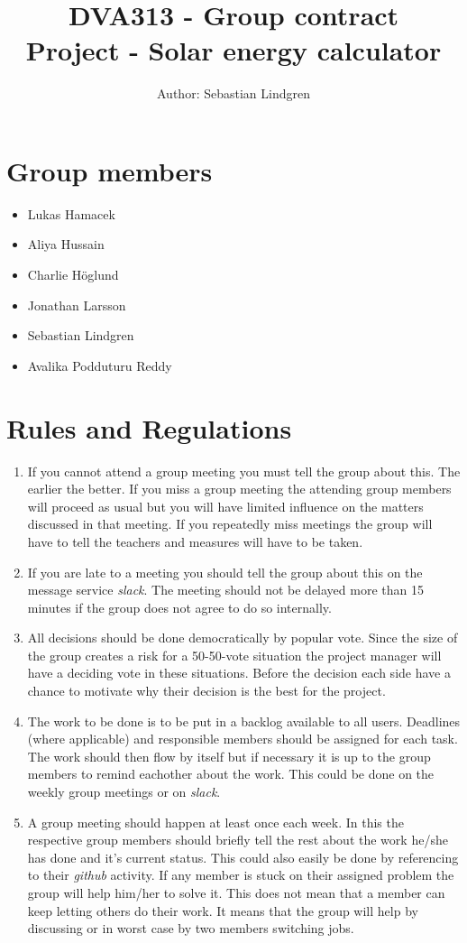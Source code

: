 \documentclass[]{article}
\title{DVA313 - Group contract\\Project - Solar energy calculator}
\author{Author: Sebastian Lindgren}
\begin{document}
\maketitle

\section{Group members}
\begin{itemize}
	\item Lukas Hamacek
	\item Aliya Hussain
	\item Charlie Höglund
	\item Jonathan Larsson
	\item Sebastian Lindgren
	\item Avalika Podduturu Reddy
\end{itemize}

\section{Rules and Regulations}
\begin{enumerate}
	\item If you cannot attend a group meeting you must tell the group about this. The earlier the better. If you miss a group meeting the attending group members will proceed as usual but you will have limited influence on the matters discussed in that meeting. If you repeatedly miss meetings the group will have to tell the teachers and measures will have to be taken. 
	\item If you are late to a meeting you should tell the group about this on the message service \textit{slack}. The meeting should not be delayed more than 15 minutes if the group does not agree to do so internally.
	\item All decisions should be done democratically by popular vote. Since the size of the group creates a risk for a 50-50-vote situation the project manager will have a deciding vote in these situations. Before the decision each side have a chance to motivate why their decision is the best for the project.
	\item The work to be done is to be put in a backlog available to all users. Deadlines (where applicable) and responsible members should be assigned for each task. The work should then flow by itself but if necessary it is up to the group members to remind eachother about the work. This could be done on the weekly group meetings or on \textit{slack}.
	\item A group meeting should happen at least once each week. In this the respective group members should briefly tell the rest about the work he/she has done and it's current status. This could also easily be done by referencing to their \textit{github} activity. If any member is stuck on their assigned problem the group will help him/her to solve it. This does not mean that a member can keep letting others do their work. It means that the group will help by discussing or in worst case by two members switching jobs.
\end{enumerate}
\end{document}
